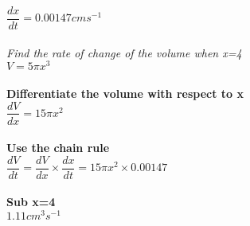\documentclass{article}[18pt]
\begin{document}
$\dfrac{dx}{dt}=0.00147cms^{-1}$\\
\\
\textit{Find the rate of change of the volume when x=4}\\
$V=5\pi x^3$\\
\\
\textbf{Differentiate the volume with respect to x}\\
$\dfrac{dV}{dx}=15\pi x^2$\\
\\
\textbf{Use the chain rule}\\
$\dfrac{dV}{dt}=\dfrac{dV}{dx}\times\dfrac{dx}{dt}=15\pi x^2\times 0.00147$\\
\\
\textbf{Sub x=4}\\
$1.11cm^3s^{-1}$
\end{document}
